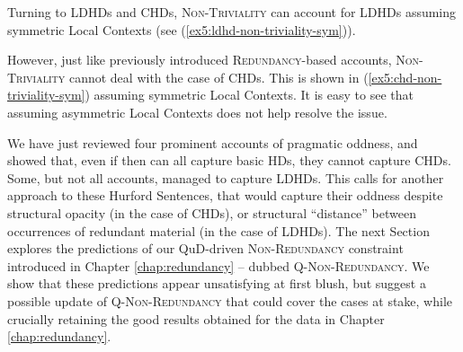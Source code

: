 Turning to LDHDs and CHDs, \textsc{Non-Triviality} can account for LDHDs assuming symmetric Local Contexts (see (\ref{ex5:ldhd-non-triviality-sym})). 

\begin{exe}
	\label{ex5:ldhd-non-triviality-sym}
\end{exe}

However, just like   previously introduced \textsc{Redundancy}-based accounts, \textsc{Non-Triviality} cannot deal with the case of CHDs. This is shown in (\ref{ex5:chd-non-triviality-sym}) assuming symmetric Local Contexts. It is easy to see that assuming asymmetric Local Contexts does not help resolve the issue.

\begin{exe}
	\label{ex5:chd-non-triviality-sym}
\end{exe}




We have just reviewed four prominent accounts of pragmatic oddness, and showed that, even if then can all capture basic HDs, they cannot capture CHDs. Some, but not all accounts, managed to capture LDHDs. This calls for another approach to these Hurford Sentences, that would capture their oddness despite structural opacity (in the case of CHDs), or structural ``distance'' between occurrences of redundant material (in the case of LDHDs). The next Section explores the predictions of our QuD-driven \textsc{Non-Redundancy} constraint introduced in Chapter \ref{chap:redundancy} -- dubbed \textsc{Q-Non-Redundancy}. We show that these predictions appear unsatisfying at first blush, but suggest a possible update of \textsc{Q-Non-Redundancy} that could cover the cases at stake, while crucially retaining the good results obtained for the data in Chapter \ref{chap:redundancy}.




